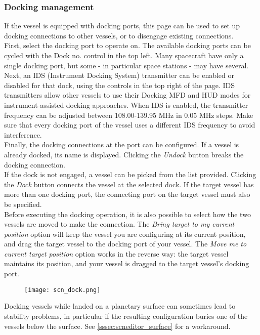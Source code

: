 \documentclass[Orbiter User Manual.tex]{subfiles}
\begin{document}
\subsubsection{Docking management}
If the vessel is equipped with docking ports, this page can be used to set up docking connections to other vessels, or to disengage existing connections.\\
First, select the docking port to operate on. The available docking ports can be cycled with the Dock no. control in the top left. Many spacecraft have only a single docking port, but some - in particular space stations - may have several.\\
Next, an IDS (Instrument Docking System) transmitter can be enabled or disabled for that dock, using the controls in the top right of the page. IDS transmitters allow other vessels to use their Docking MFD and HUD modes for instrument-assisted docking approaches. When IDS is enabled, the transmitter frequency can be adjusted between 108.00-139.95 MHz in 0.05 MHz steps. Make sure that every docking port of the vessel uses a different IDS frequency to avoid interference.\\
Finally, the docking connections at the port can be configured. If a vessel is already docked, its name is displayed. Clicking the \textit{Undock} button breaks the docking connection.\\
If the dock is not engaged, a vessel can be picked from the list provided. Clicking the \textit{Dock} button connects the vessel at the selected dock. If the target vessel has more than one docking port, the connecting port on the target vessel must also be specified.\\
Before executing the docking operation, it is also possible to select how the two vessels are moved to make the connection. The \textit{Bring target to my current position} option will keep the vessel you are configuring at its current position, and drag the target vessel to the docking port of your vessel. The \textit{Move me to current target position} option works in the reverse way: the target vessel maintains its position, and your vessel is dragged to the target vessel's docking port.

\begin{figure}[H]
	\centering
	\texttt{[image: scn\_dock.png]}
\end{figure}

\noindent
Docking vessels while landed on a planetary surface can sometimes lead to stability problems, in particular if the resulting configuration buries one of the vessels below the surface. See \ref{sssec:scneditor_surface} for a workaround.
\end{document}
